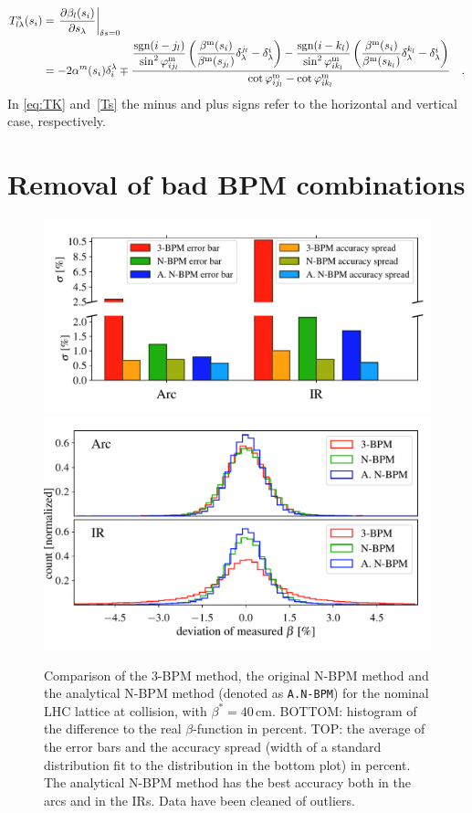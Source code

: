   \begin{align}
      T^s_{l\lambda}(s_i) &= \left.\frac{\partial \beta_l(s_i)}{\partial s_\lambda}\right|_{\delta s = 0} \notag \\
      &= -2\alpha^m(s_i)\delta_i^{\lambda}
      \mp 
      \frac{
          \dfrac{\text{sgn}(i-j_l)}{\sin^2 \varphi_{ij_l}^\text{m}}\left(\dfrac{\beta^\text{m}(s_i)}{\beta^\text{m}(s_{j_l})}\delta^{j_l}_\lambda - \delta_\lambda^i\right) -
          \dfrac{\text{sgn}(i-k_l)}{\sin^2 \varphi_{ik_l}^\text{m}}\left(\dfrac{\beta^\text{m}(s_i)}{\beta^\text{m}(s_{k_l})}\delta^{k_l}_\lambda - \delta_\lambda^i\right)}
      {\cot \varphi_{ij_l}^\text{m} - \cot \varphi_{ik_l}^\text{m}} \quad .
      \label{Ts}
  \end{align}
  In \eqref{eq:TK} and~\eqref{Ts} the minus and plus signs refer to the horizontal and vertical case, respectively. 

\section{Removal of bad BPM combinations}


\begin{figure}
	\centering
  \includegraphics[width=.49\linewidth]{comparison_statistics_007_bars}
    \includegraphics[width=.49\linewidth]{comparison_statistics_006}
	\caption{Comparison of the 3-BPM method, the original N-BPM method and the analytical N-BPM method (denoted as \texttt{A.N-BPM}) for the nominal LHC lattice at collision, with $ \beta^*=40\,\text{cm} $. BOTTOM: histogram of the difference to the real $\beta$-function in percent. TOP: the average of the error bars and the accuracy spread (width of a standard distribution fit to the distribution in the bottom plot) in percent.  The analytical N-BPM method has the best accuracy both in the arcs and in the IRs. Data have been cleaned of outliers.}
	\label{fig:compare_NBPM_to_3BPM}
\end{figure}

